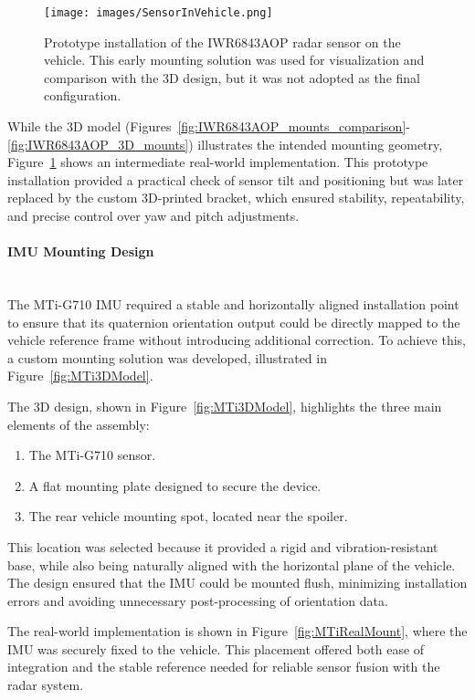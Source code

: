 \begin{figure}[!htbp]
    \centering
    \texttt{[image: images/SensorInVehicle.png]}
    \caption{Prototype installation of the IWR6843AOP radar sensor on the vehicle. 
    This early mounting solution was used for visualization and comparison with the 3D design, but it was not adopted as the final configuration.}
    \label{fig:SensorInVehicle}
\end{figure}

While the 3D model (Figures~\ref{fig:IWR6843AOP_mounts_comparison}-\ref{fig:IWR6843AOP_3D_mounts}) illustrates the intended mounting geometry, Figure~\ref{fig:SensorInVehicle} shows an intermediate real-world implementation.
This prototype installation provided a practical check of sensor tilt and positioning but was later replaced by the custom 3D-printed bracket, which ensured stability, repeatability, and precise control over yaw and pitch adjustments.

\vspace{0.5em}
\paragraph{IMU Mounting Design}
\hfill
\\
\indent The MTi-G710 IMU required a stable and horizontally aligned installation point to ensure that its quaternion orientation output could be directly mapped to the vehicle reference frame without introducing additional correction.  
To achieve this, a custom mounting solution was developed, illustrated in Figure~\ref{fig:MTi3DModel}.  

The 3D design, shown in Figure~\ref{fig:MTi3DModel}, highlights the three main elements of the assembly:  
\begin{enumerate}
    \item The MTi-G710 sensor.  
    \item A flat mounting plate designed to secure the device.  
    \item The rear vehicle mounting spot, located near the spoiler.  
\end{enumerate}

This location was selected because it provided a rigid and vibration-resistant base, while also being naturally aligned with the horizontal plane of the vehicle.  
The design ensured that the IMU could be mounted flush, minimizing installation errors and avoiding unnecessary post-processing of orientation data.  

The real-world implementation is shown in Figure~\ref{fig:MTiRealMount}, where the IMU was securely fixed to the vehicle.  
This placement offered both ease of integration and the stable reference needed for reliable sensor fusion with the radar system.  


